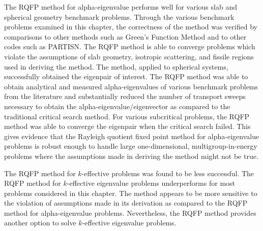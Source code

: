 The RQFP method for alpha-eigenvalue performs well for various slab and spherical geometry benchmark problems. Through the various benchmark problems examined in this chapter, the correctness of the method was verified by comparisons to other methods such as Green's Function Method and to other codes such as PARTISN. The RQFP method is able to converge problems which violate the assumptions of slab geometry, isotropic scattering, and fissile regions used in deriving the method. The method, applied to spherical systems, successfully obtained the eigenpair of interest. The RQFP method was able to obtain analytical and measured alpha-eigenvalues of various benchmark problems from the literature and substantially reduced the number of transport sweeps necessary to obtain the alpha-eigenvalue/eigenvector as compared to the traditional critical search method. For various subcritical problems, the RQFP method was able to converge the eigenpair when the critical search failed. This gives evidence that the Rayleigh quotient fixed point method for alpha-eigenvalue problems is robust enough to handle large one-dimensional, multigroup-in-energy problems where the assumptions made in deriving the method might not be true.

The RQFP method for $k$-effective problems was found to be less successful. The RQFP method for $k$-effective eigenvalue problems underperforms for most problems considered in this chapter. The method appears to be more sensitive to the violation of assumptions made in its derivation as compared to the RQFP method for alpha-eigenvalue problems. 
Nevertheless, the RQFP method provides another option to solve $k$-effective eigenvalue problems.

%

